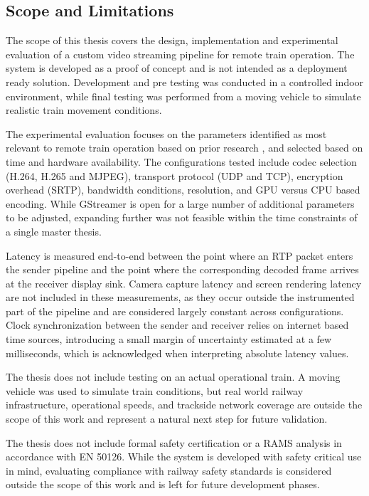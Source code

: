 \subsection{Scope and Limitations}

The scope of this thesis covers the design, implementation and experimental evaluation of a custom video streaming pipeline for remote train operation. The system is developed as a proof of concept and is not intended as a deployment ready solution. Development and pre testing was conducted in a controlled indoor environment, while final testing was performed from a moving vehicle to simulate realistic train movement conditions.

The experimental evaluation focuses on the parameters identified as most relevant to remote train operation based on prior research \cite{myhrvold2025}, and selected based on time and hardware availability. The configurations tested include codec selection (H.264, H.265 and MJPEG), transport protocol (UDP and TCP), encryption overhead (SRTP), bandwidth conditions, resolution, and GPU versus CPU based encoding. While GStreamer is open for a large number of additional parameters to be adjusted, expanding further was not feasible within the time constraints of a single master thesis.

Latency is measured end-to-end between the point where an RTP packet enters the sender pipeline and the point where the corresponding decoded frame arrives at the receiver display sink. Camera capture latency and screen rendering latency are not included in these measurements, as they occur outside the instrumented part of the pipeline and are considered largely constant across configurations. Clock synchronization between the sender and receiver relies on internet based time sources, introducing a small margin of uncertainty estimated at a few milliseconds, which is acknowledged when interpreting absolute latency values.

The thesis does not include testing on an actual operational train. A moving vehicle was used to simulate train conditions, but real world railway infrastructure, operational speeds, and trackside network coverage are outside the scope of this work and represent a natural next step for future validation.

The thesis does not include formal safety certification or a RAMS analysis in accordance with EN 50126. While the system is developed with safety critical use in mind, evaluating compliance with railway safety standards is considered outside the scope of this work and is left for future development phases.

